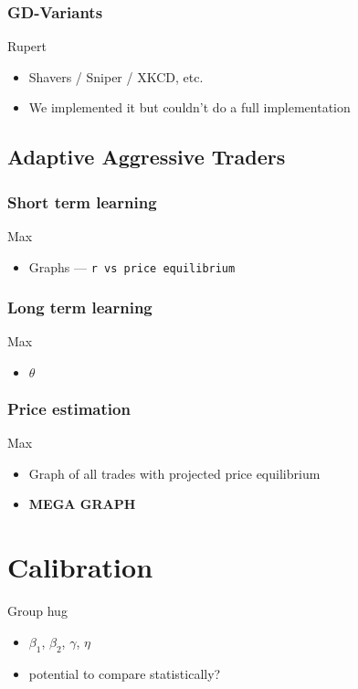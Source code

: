 \documentclass{acm_proc_article-sp}
\begin{document}
\subsubsection{GD-Variants}
Rupert
\begin{itemize} \itemsep0pt
	\item Shavers / Sniper / XKCD, etc.
	\item We implemented it but couldn't do a full implementation
\end{itemize}

\subsection{Adaptive Aggressive Traders}
\subsubsection{Short term learning}
Max
\begin{itemize} \itemsep0pt
	\item Graphs --- \tt r \rm vs price equilibrium
\end{itemize}

\subsubsection{Long term learning}
Max
\begin{itemize} \itemsep0pt
	\item $\theta$
\end{itemize}

\subsubsection{Price estimation}
Max
\begin{itemize} \itemsep0pt
	\item Graph of all trades with projected price equilibrium
	\item \textbf{MEGA GRAPH}
\end{itemize}


\section{Calibration}
Group hug
\begin{itemize} \itemsep0pt
	\item $\beta_1$, $\beta_2$, $\gamma$, $\eta$
	\item potential to compare statistically?
\end{itemize}
\end{document}

